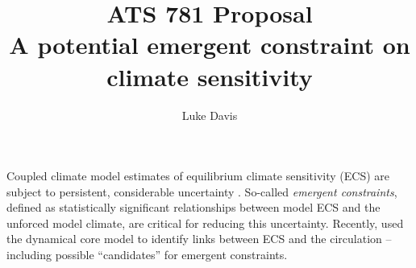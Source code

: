 \documentclass[12pt]{article}
\title{%
  \Large
  ATS 781 Proposal\\
  \Large
  A potential emergent constraint
  on climate sensitivity
  \vspace{-0.5em}
}
\author{%
  Luke Davis
  \vspace{-0.5em}
  \vspace{-0.5em}
  \vspace{-0.5em}
}
\date{}
\begin{document}
  \maketitle
  


  Coupled climate model estimates of
  equilibrium climate sensitivity (ECS)
  are subject to persistent, considerable uncertainty
  \citep[e.g.,][]{zelinka_causes_2020}.
  So-called \textit{emergent constraints}, defined as statistically significant
  relationships between model ECS and the unforced model climate,
  are critical for reducing this uncertainty.
  Recently,
  \citet{davis_relationships_nodate}
  used the dynamical core model to identify
  links between ECS and the circulation
  --
  including possible ``candidates'' for emergent constraints.
\end{document}
